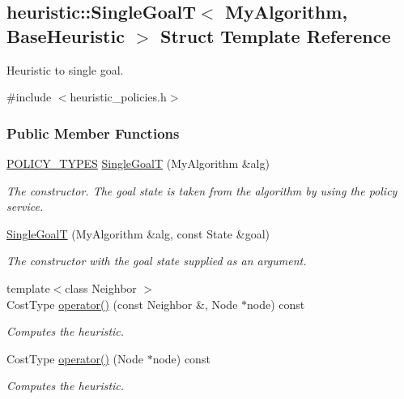 \hypertarget{structheuristic_1_1SingleGoalT}{}\subsection{heuristic\+:\+:Single\+GoalT$<$ My\+Algorithm, Base\+Heuristic $>$ Struct Template Reference}
\label{structheuristic_1_1SingleGoalT}


Heuristic to single goal.  




{\ttfamily \#include $<$heuristic\+\_\+policies.\+h$>$}

\subsubsection*{Public Member Functions}
\begin{DoxyCompactItemize}
\item 
\hyperlink{extensions_2shared__policies_2headers_8h_ae70a06fa4631780beea14971eb36a562}{P\+O\+L\+I\+C\+Y\+\_\+\+T\+Y\+P\+ES} \hyperlink{structheuristic_1_1SingleGoalT_a38aacbe24326b34e35769b940c9fdb41}{Single\+GoalT} (My\+Algorithm \&alg)
\begin{DoxyCompactList}\small\item\em The constructor. The goal state is taken from the algorithm by using the policy service. \end{DoxyCompactList}\item 
\hyperlink{structheuristic_1_1SingleGoalT_a1e42adad6fffb54d2441fa0826a763ef}{Single\+GoalT} (My\+Algorithm \&alg, const State \&goal)
\begin{DoxyCompactList}\small\item\em The constructor with the goal state supplied as an argument. \end{DoxyCompactList}\item 
{\footnotesize template$<$class Neighbor $>$ }\\Cost\+Type \hyperlink{structheuristic_1_1SingleGoalT_aa0215118db550deffaa8d4a4bfd8af03}{operator()} (const Neighbor \&, Node $\ast$node) const 
\begin{DoxyCompactList}\small\item\em Computes the heuristic. \end{DoxyCompactList}\item 
Cost\+Type \hyperlink{structheuristic_1_1SingleGoalT_ac3b076ed7eeff4b0f0bfd563ab3721ce}{operator()} (Node $\ast$node) const 
\begin{DoxyCompactList}\small\item\em Computes the heuristic. \end{DoxyCompactList}\end{DoxyCompactItemize}
